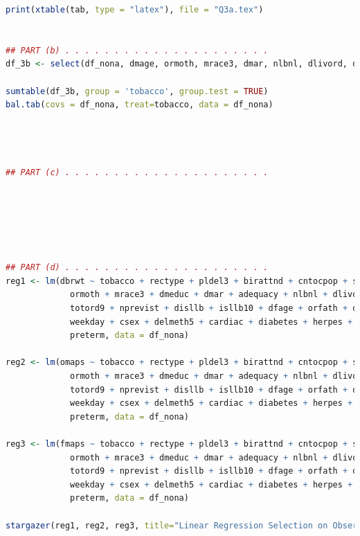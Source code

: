 \documentclass[12pt]{article}
\begin{document}
\begin{lstlisting}[language=R]
print(xtable(tab, type = "latex"), file = "Q3a.tex")


## PART (b) . . . . . . . . . . . . . . . . . . . . . 
df_3b <- select(df_nona, dmage, ormoth, mrace3, dmar, nlbnl, dlivord, dfage, orfath, dfeduc, csex, cardiac, lung, diabetes, herpes, chyper, tobacco)

sumtable(df_3b, group = 'tobacco', group.test = TRUE)
bal.tab(covs = df_nona, treat=tobacco, data = df_nona)




## PART (c) . . . . . . . . . . . . . . . . . . . . . 






## PART (d) . . . . . . . . . . . . . . . . . . . . . 
reg1 <- lm(dbrwt ~ tobacco + rectype + pldel3 + birattnd + cntocpop + stresfip + dmage + 
             ormoth + mrace3 + dmeduc + dmar + adequacy + nlbnl + dlivord + dtotord + 
             totord9 + nprevist + disllb + isllb10 + dfage + orfath + dfeduc + 
             weekday + csex + delmeth5 + cardiac + diabetes + herpes + chyper + 
             preterm, data = df_nona)

reg2 <- lm(omaps ~ tobacco + rectype + pldel3 + birattnd + cntocpop + stresfip + dmage +
             ormoth + mrace3 + dmeduc + dmar + adequacy + nlbnl + dlivord + dtotord + 
             totord9 + nprevist + disllb + isllb10 + dfage + orfath + dfeduc + 
             weekday + csex + delmeth5 + cardiac + diabetes + herpes + chyper + 
             preterm, data = df_nona)

reg3 <- lm(fmaps ~ tobacco + rectype + pldel3 + birattnd + cntocpop + stresfip + dmage + 
             ormoth + mrace3 + dmeduc + dmar + adequacy + nlbnl + dlivord + dtotord + 
             totord9 + nprevist + disllb + isllb10 + dfage + orfath + dfeduc + 
             weekday + csex + delmeth5 + cardiac + diabetes + herpes + chyper + 
             preterm, data = df_nona)

stargazer(reg1, reg2, reg3, title="Linear Regression Selection on Observables", align = TRUE)
\end{lstlisting}
\end{document}
